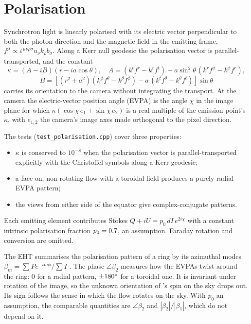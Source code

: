\section{Polarisation}
\label{sec:xpol}

Synchrotron light is linearly polarised with its electric vector
perpendicular to both the photon direction and the magnetic field in the
emitting frame, $f^\mu \propto \varepsilon^{\mu\nu\rho\sigma}u_\nu k_\rho
b_\sigma$. Along a Kerr null geodesic the polarisation vector is parallel-
transported, and the \citet{WalkerPenrose1970} constant
\begin{equation}
\kappa = (A - iB)(r - ia\cos\theta), \quad
A = (k^tf^r - k^rf^t) + a\sin^2\theta\,(k^rf^\phi - k^\phi f^r),
\end{equation}
\begin{equation*}
B = \left[(r^2 + a^2)(k^\phi f^\theta - k^\theta f^\phi) - a\,(k^tf^\theta - k^\theta f^t)\right]\sin\theta
\end{equation*}
\citep{ConnorsPiranStark1980, Himwich2020} carries its orientation to the
camera without integrating the transport. At the camera the electric-vector
position angle (EVPA) is the angle $\chi$ in the image plane for which
$\kappa(\cos\chi\,e_1 + \sin\chi\,e_2)$ is a real multiple of the emission
point's $\kappa$, with $e_{1,2}$ the camera's image axes made orthogonal to
the pixel direction.

The tests (\texttt{test\_polarisation.cpp}) cover three properties:
\begin{itemize}
\item $\kappa$ is conserved to $10^{-8}$ when the polarisation vector is
parallel-transported explicitly with the Christoffel symbols along a Kerr
geodesic;
\item a face-on, non-rotating flow with a toroidal field produces a purely
radial EVPA pattern;
\item the views from either side of the equator give complex-conjugate
patterns.
\end{itemize}
Each emitting element contributes Stokes $Q + iU = p_0\,dI\,e^{2i\chi}$ with
a constant intrinsic polarisation fraction $p_0 = 0.7$, an assumption.
Faraday rotation and conversion are omitted.

The EHT summarises the polarisation pattern of a ring by its azimuthal modes
$\beta_m = \sum P e^{-im\phi}/\sum I$ \citep{Palumbo2020}. The phase
$\angle\beta_2$ measures how the EVPAs twist around the ring: 0 for a radial
pattern, $\pm180^\circ$ for a toroidal one. It is invariant under rotation of
the image, so the unknown orientation of \sgra's spin on the sky drops out.
Its sign follows the sense in which the flow rotates on the sky. With $p_0$
an assumption, the comparable quantities are $\angle\beta_2$ and
$|\beta_2|/|\beta_1|$, which do not depend on it.

